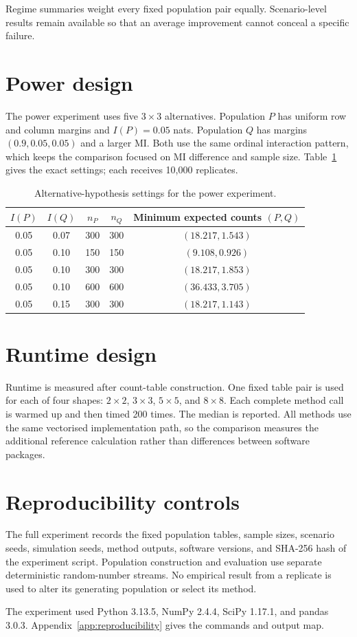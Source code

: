 Regime summaries weight every fixed population pair equally. Scenario-level
results remain available so that an average improvement cannot conceal a
specific failure.

\section{Power design}

The power experiment uses five \(3\times3\) alternatives. Population \(P\)
has uniform row and column margins and \(I(P)=0.05\) nats. Population \(Q\)
has margins \((0.9,0.05,0.05)\) and a larger MI. Both use the same ordinal
interaction pattern, which keeps the comparison focused on MI difference and
sample size. Table~\ref{tab:power-design} gives the exact settings; each
receives 10,000 replicates.

\begin{table}[htbp]
\centering
\caption{Alternative-hypothesis settings for the power experiment.}
\label{tab:power-design}
\begin{tabular}{@{}ccccc@{}}
\toprule
\(I(P)\) & \(I(Q)\) & \(n_P\) & \(n_Q\) & Minimum expected counts \((P,Q)\) \\
\midrule
0.05 & 0.07 & 300 & 300 & \((18.217,1.543)\) \\
0.05 & 0.10 & 150 & 150 & \((9.108,0.926)\) \\
0.05 & 0.10 & 300 & 300 & \((18.217,1.853)\) \\
0.05 & 0.10 & 600 & 600 & \((36.433,3.705)\) \\
0.05 & 0.15 & 300 & 300 & \((18.217,1.143)\) \\
\bottomrule
\end{tabular}
\end{table}

\section{Runtime design}

Runtime is measured after count-table construction. One fixed table pair is
used for each of four shapes: \(2\times2\), \(3\times3\), \(5\times5\), and
\(8\times8\). Each complete method call is warmed up and then timed 200 times.
The median is reported. All methods use the same vectorised implementation
path, so the comparison measures the additional reference calculation rather
than differences between software packages.

\section{Reproducibility controls}

The full experiment records the fixed population tables, sample sizes,
scenario seeds, simulation seeds, method outputs, software versions, and SHA-256
hash of the experiment script. Population construction and evaluation use
separate deterministic random-number streams. No empirical result from a
replicate is used to alter its generating population or select its method.

The experiment used Python 3.13.5, NumPy 2.4.4, SciPy 1.17.1, and pandas
3.0.3. Appendix~\ref{app:reproducibility} gives the commands and output map.
